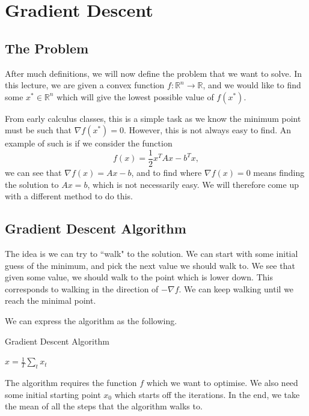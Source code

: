 \documentclass[12pt]{article}
\newcommand{\real}{\mathbb{R}}
\begin{document}
\section{Gradient Descent}

\subsection{The Problem}

After much definitions, we will now define the problem that we want to solve. In this lecture, we are given a convex function $f: \real^n \to \real$, and we would like to find some $x^* \in \real^n$ which will give the lowest possible value of $f(x^*)$. 

From early calculus classes, this is a simple task as we know the minimum point must be such that $\nabla f(x^*) = 0$. However, this is not always easy to find. An example of such is if we consider the function $$f(x) = \frac{1}{2}x^TAx - b^Tx,$$ we can see that $\nabla f(x) = Ax - b$, and to find where $\nabla f(x) = 0$ means finding the solution to $Ax = b$, which is not necessarily easy. We will therefore come up with a different method to do this.

\subsection{Gradient Descent Algorithm}

The idea is we can try to ``walk" to the solution. We can start with some initial guess of the minimum, and pick the next value we should walk to. We see that given some value, we should walk to the point which is lower down. This corresponds to walking in the direction of $-\nabla f$. We can keep walking until we reach the minimal point.

We can express the algorithm as the following.
\begin{algorithm}[H]
	\caption{Gradient Descent Algorithm}
	\begin{algorithmic}[1]
		\EndFor
		\State \Return $\hat{x} = \frac{1}{T} \sum_{t} x_t$
		\EndFunction
	\end{algorithmic}
\end{algorithm}
The algorithm requires the function $f$ which we want to optimise. We also need some initial starting point $x_0$ which starts off the iterations. In the end, we take the mean of all the steps that the algorithm walks to.
\end{document}
